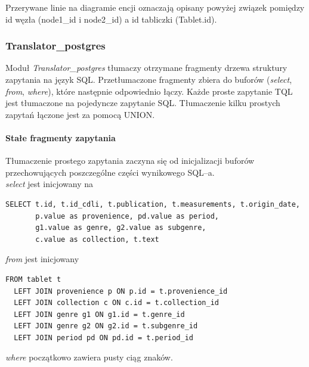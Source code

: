 Przerywane linie na diagramie encji oznaczają opisany powyżej związek pomiędzy id węzła (node1\_id i node2\_id) 
a id tabliczki (Tablet.id).


 

\subsubsection{Translator\_postgres}
Moduł \textit{Translator\_postgres} tłumaczy otrzymane fragmenty drzewa struktury zapytania na język SQL. Przetłumaczone fragmenty zbiera do buforów 
(\textit{select}, \textit{from}, \textit{where}), które następnie odpowiednio łączy.
Każde proste zapytanie TQL jest tłumaczone na pojedyncze zapytanie SQL. Tłumaczenie kilku prostych zapytań
łączone jest za pomocą UNION.

\paragraph{Stałe fragmenty zapytania}
Tłumaczenie prostego zapytania zaczyna się od inicjalizacji buforów przechowujących poszczególne części wynikowego SQL--a.\\
\textit{select} jest inicjowany na 
\begin{verbatim}
SELECT t.id, t.id_cdli, t.publication, t.measurements, t.origin_date, 
       p.value as provenience, pd.value as period,
       g1.value as genre, g2.value as subgenre, 
       c.value as collection, t.text
\end{verbatim}
\textit{from} jest inicjowany
\begin{verbatim}
FROM tablet t
  LEFT JOIN provenience p ON p.id = t.provenience_id
  LEFT JOIN collection c ON c.id = t.collection_id
  LEFT JOIN genre g1 ON g1.id = t.genre_id
  LEFT JOIN genre g2 ON g2.id = t.subgenre_id
  LEFT JOIN period pd ON pd.id = t.period_id
\end{verbatim}
\textit{where} początkowo zawiera pusty ciąg znaków.



